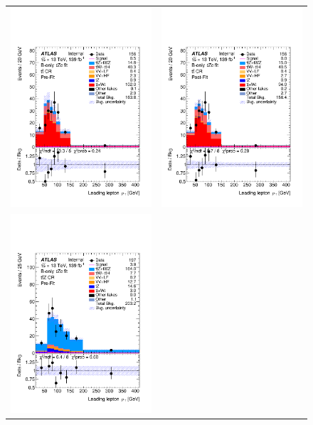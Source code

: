 \begin{figure}[htbp]
	\centering
	\begin{tabular}{cc}
		\includegraphics[width=.45\textwidth]{Appendices/AP10/figures/BONLY_CRSR_DL1rc_unblind/Plots/TTCR} &
		\includegraphics[width=.45\textwidth]{Appendices/AP10/figures/BONLY_CRSR_DL1rc_unblind/Plots/TTCR_postFit} \\
		\includegraphics[width=.45\textwidth]{Appendices/AP10/figures/BONLY_CRSR_DL1rc_unblind/Plots/TTZCR} &

\end{tabular}
\end{figure}
